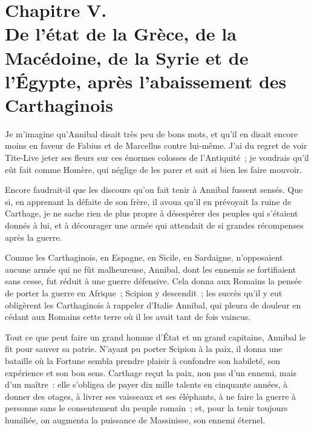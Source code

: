 \documentclass[french,twoside]{book} %
\newcommand\chapteropen{} %
\newcommand\chaptercont{} %
\begin{document}
\chapteropen
\chapter[{Chapitre V. De l’état de la Grèce, de la Macédoine, de la Syrie et de l’Égypte, après l’abaissement des Carthaginois}]{Chapitre V. \\
De l’état de la Grèce, de la Macédoine, de la Syrie et de l’Égypte, après l’abaissement des Carthaginois}
\label{considérations\_Romains\_chap\_05}\renewcommand{\leftmark}{Chapitre V. \\
De l’état de la Grèce, de la Macédoine, de la Syrie et de l’Égypte, après l’abaissement des Carthaginois}


\chaptercont
\noindent Je m’imagine qu’Annibal disait très peu de bons mots, et qu’il en disait encore moins en faveur de Fabius et de Marcellus contre lui-même. J’ai du regret de voir Tite-Live jeter ses fleurs sur ces énormes colosses de l’Antiquité ; je voudrais qu’il eût fait comme Homère, qui néglige de les parer et sait si bien les faire mouvoir.\par
Encore faudrait-il que les discours qu’on fait tenir à Annibal fussent sensés. Que si, en apprenant la défaite de son frère, il avoua qu’il en prévoyait la ruine de Carthage, je ne sache rien de plus propre à désespérer des peuples qui s’étaient donnés à lui, et à décourager une armée qui attendait de si grandes récompenses après la guerre.\par
Comme les Carthaginois, en Espagne, en Sicile, en Sardaigne, n’opposaient aucune armée qui ne fût malheureuse, Annibal, dont les ennemis se fortifiaient sans cesse, fut réduit à une guerre défensive. Cela donna aux Romains la pensée de porter la guerre en Afrique ; Scipion y descendit ; les succès qu’il y eut obligèrent les Carthaginois à rappeler d’Italie Annibal, qui pleura de douleur en cédant aux Romains cette terre où il les avait tant de fois vaincus.\par
Tout ce que peut faire un grand homme d’État et un grand capitaine, Annibal le fit pour sauver sa patrie. N’ayant pu porter Scipion à la paix, il donna une bataille où la Fortune sembla prendre plaisir à confondre son habileté, son expérience et son bon sens. Carthage reçut la paix, non pas d’un ennemi, mais d’un maître : elle s’obligea de payer dix mille talents en cinquante années, à donner des otages, à livrer ses vaisseaux et ses éléphants, à ne faire la guerre à personne sans le consentement du peuple romain ; et, pour la tenir toujours humiliée, on augmenta la puissance de Massinisse, son ennemi éternel.\par
\end{document}
